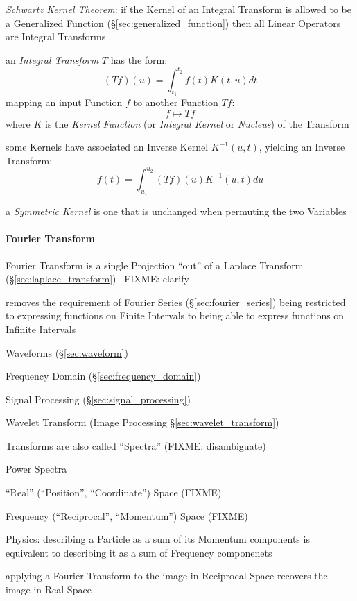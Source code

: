 \emph{Schwartz Kernel Theorem}: if the Kernel of an Integral Transform is
allowed to be a Generalized Function (\S\ref{sec:generalized_function}) then
all Linear Operators are Integral Transforms

an \emph{Integral Transform} $T$ has the form:
\[
  (T f)(u) = \int_{t_1}^{t_2} f(t) K(t,u) dt
\]
mapping an input Function $f$ to another Function $T f$:
\[
  f \mapsto T f
\]
where $K$ is the \emph{Kernel Function} (or \emph{Integral Kernel} or
\emph{Nucleus}) of the Transform

some Kernels have associated an Inverse Kernel $K^{-1}(u,t)$, yielding an
Inverse Transform:
\[
  f(t) = \int_{u_1}^{u_2} (T f)(u) K^{-1}(u,t) du
\]

a \emph{Symmetric Kernel} is one that is unchanged when permuting the two
Variables



\paragraph{Fourier Transform}\label{sec:fourier_transform}\hfill

Fourier Transform is a single Projection ``out'' of a Laplace Transform
(\S\ref{sec:laplace_transform}) --FIXME: clarify

removes the requirement of Fourier Series (\S\ref{sec:fourier_series}) being
restricted to expressing functions on Finite Intervals to being able to express
functions on Infinite Intervals

\fist Waveforms (\S\ref{sec:waveform})

\fist Frequency Domain (\S\ref{sec:frequency_domain})

\fist Signal Processing (\S\ref{sec:signal_processing})

\fist Wavelet Transform (Image Processing \S\ref{sec:wavelet_transform})

Transforms are also called ``Spectra'' (FIXME: disambiguate)

Power Spectra

``Real'' (``Position'', ``Coordinate'') Space (FIXME)

Frequency (``Reciprocal'', ``Momentum'') Space (FIXME)

Physics: describing a Particle as a sum of its Momentum components is equivalent
to describing it as a sum of Frequency componenets

applying a Fourier Transform to the image in Reciprocal Space recovers the image
in Real Space

